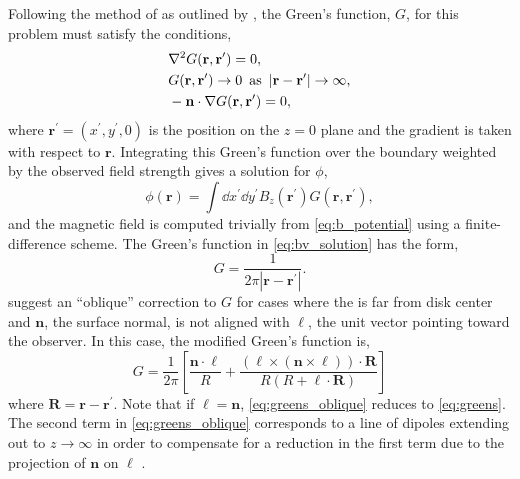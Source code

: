 Following the method of \citet{schmidt_observable_1964} as outlined by \citet{sakurai_greens_1982}, the Green's function, $G$, for this problem must satisfy the conditions,
\begin{align}
    &\nabla^2G(\mathbf{r},\mathbf{r}^\prime) = 0, \nonumber \\
    &G(\mathbf{r},\mathbf{r}^\prime) \to 0 \enspace \textup{as} \enspace |\mathbf{r}-\mathbf{r}^\prime|\to\infty, \nonumber \\
    &-\mathbf{n}\cdot\nabla G(\mathbf{r},\mathbf{r}^\prime) = 0, \nonumber
\end{align} 
where $\mathbf{r}^\prime=(x^\prime,y^\prime,0)$ is the position on the $z=0$ plane and the gradient is taken with respect to $\mathbf{r}$. Integrating this Green's function over the boundary weighted by the observed field strength gives a solution for $\phi$,
\begin{equation}\label{eq:bv_solution}
    \phi(\mathbf{r}) = \int\dd{x^\prime}\dd{y^\prime}B_z(\mathbf{r}^\prime)G(\mathbf{r},\mathbf{r}^\prime),
\end{equation}
and the magnetic field is computed trivially from \autoref{eq:b_potential} using a finite-difference scheme. The Green's function in \autoref{eq:bv_solution} has the form,
\begin{equation}\label{eq:greens}
    G = \frac{1}{2\pi|\mathbf{r} - \mathbf{r}^\prime|}.
\end{equation}
\citet{schmidt_observable_1964} suggest an ``oblique'' correction to $G$ for cases where the \AR{} is far from disk center and $\mathbf{n}$, the surface normal, is not aligned with $\bm{\ell}$, the unit vector pointing toward the observer. In this case, the modified Green's function is,
\begin{equation}\label{eq:greens_oblique}
    G = \frac{1}{2\pi}\left[\frac{\mathbf{n}\cdot\bm{\ell}}{R} + \frac{(\bm{\ell}\times(\mathbf{n}\times\bm{\ell}))\cdot\mathbf{R}}{R(R + \bm{\ell}\cdot\mathbf{R})} \right]
\end{equation}
where $\mathbf{R}=\mathbf{r} - \mathbf{r}^\prime$. Note that if $\bm{\ell}=\mathbf{n}$, \autoref{eq:greens_oblique} reduces to \autoref{eq:greens}. The second term in \autoref{eq:greens_oblique} corresponds to a line of dipoles extending out to $z\to\infty$ in order to compensate for a reduction in the first term due to the projection of $\mathbf{n}$ on $\bm{\ell}$ \citep{sakurai_greens_1982}.

